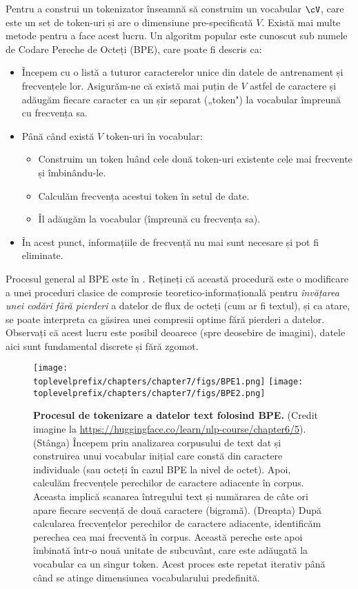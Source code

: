 \documentclass[../../book-main_ro.tex]{subfiles}
\begin{document}
Pentru a construi un tokenizator înseamnă să construim un vocabular \(\cV\), care este un set de token-uri și are o dimensiune pre-specificată \(V\). Există mai multe metode pentru a face acest lucru. Un algoritm popular este cunoscut sub numele de Codare Pereche de Octeți (BPE), care poate fi descris ca:
\begin{itemize}
    \item Începem cu o listă a tuturor caracterelor unice din datele de antrenament și frecvențele lor. Asigurăm-ne că există mai puțin de \(V\) astfel de caractere și adăugăm fiecare caracter ca un șir separat („token") la vocabular împreună cu frecvența sa.
    \item Până când există \(V\) token-uri în vocabular:
    \begin{itemize}
        \item Construim un token luând cele două token-uri existente cele mai frecvente și îmbinându-le.
        \item Calculăm frecvența acestui token în setul de date.
        \item Îl adăugăm la vocabular (împreună cu frecvența sa).
    \end{itemize} 
    \item În acest punct, informațiile de frecvență nu mai sunt necesare și pot fi eliminate.
\end{itemize}
Procesul general al BPE este în . Rețineți că această procedură este o modificare a unei proceduri clasice de compresie teoretico-informațională pentru \textit{învățarea unei codări fără pierderi} a datelor de flux de octeți (cum ar fi textul), și ca atare, se poate interpreta ca găsirea unei compresii optime fără pierderi a datelor. Observați că acest lucru este posibil deoarece (spre deosebire de imagini), datele aici sunt fundamental discrete și fără zgomot.
\begin{figure}
    \centering
    \texttt{[image: \\toplevelprefix/chapters/chapter7/figs/BPE1.png]}\hspace{0.6in} 
    \texttt{[image: \\toplevelprefix/chapters/chapter7/figs/BPE2.png]} 
    \caption{\small {\bf Procesul de tokenizare a datelor text folosind BPE.} (Credit imagine la \url{https://huggingface.co/learn/nlp-course/chapter6/5}). (Stânga) Începem prin analizarea corpusului de text dat și construirea unui vocabular inițial care constă din caractere individuale (sau octeți în cazul BPE la nivel de octet). Apoi, calculăm frecvențele perechilor de caractere adiacente în corpus. Aceasta implică scanarea întregului text și numărarea de câte ori apare fiecare secvență de două caractere (bigramă). (Dreapta) După calcularea frecvențelor perechilor de caractere adiacente, identificăm perechea cea mai frecventă în corpus. Această pereche este apoi îmbinată într-o nouă unitate de subcuvânt, care este adăugată la vocabular ca un singur token. Acest proces este repetat iterativ până când se atinge dimensiunea vocabularului predefinită.}
    \label{fig:BPE}
\end{figure}
\end{document}
